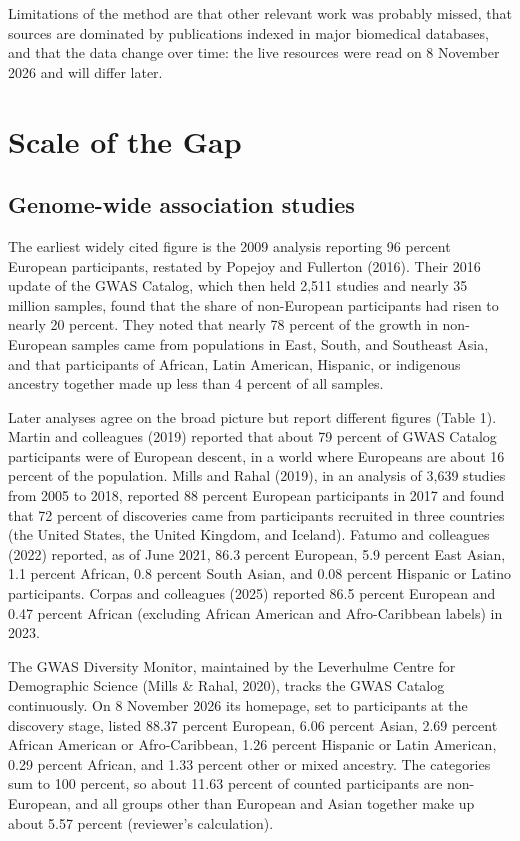 \documentclass[12pt]{article}
\begin{document}
Limitations of the method are that other relevant work was probably missed, that sources are dominated by publications indexed in major biomedical databases, and that the data change over time: the live resources were read on 8 November 2026 and will differ later.

\section*{Scale of the Gap}
\subsection*{Genome-wide association studies}
The earliest widely cited figure is the 2009 analysis reporting 96 percent European participants, restated by Popejoy and Fullerton (2016). Their 2016 update of the GWAS Catalog, which then held 2,511 studies and nearly 35 million samples, found that the share of non-European participants had risen to nearly 20 percent. They noted that nearly 78 percent of the growth in non-European samples came from populations in East, South, and Southeast Asia, and that participants of African, Latin American, Hispanic, or indigenous ancestry together made up less than 4 percent of all samples.

Later analyses agree on the broad picture but report different figures (Table 1). Martin and colleagues (2019) reported that about 79 percent of GWAS Catalog participants were of European descent, in a world where Europeans are about 16 percent of the population. Mills and Rahal (2019), in an analysis of 3,639 studies from 2005 to 2018, reported 88 percent European participants in 2017 and found that 72 percent of discoveries came from participants recruited in three countries (the United States, the United Kingdom, and Iceland). Fatumo and colleagues (2022) reported, as of June 2021, 86.3 percent European, 5.9 percent East Asian, 1.1 percent African, 0.8 percent South Asian, and 0.08 percent Hispanic or Latino participants. Corpas and colleagues (2025) reported 86.5 percent European and 0.47 percent African (excluding African American and Afro-Caribbean labels) in 2023.

The GWAS Diversity Monitor, maintained by the Leverhulme Centre for Demographic Science (Mills \& Rahal, 2020), tracks the GWAS Catalog continuously. On 8 November 2026 its homepage, set to participants at the discovery stage, listed 88.37 percent European, 6.06 percent Asian, 2.69 percent African American or Afro-Caribbean, 1.26 percent Hispanic or Latin American, 0.29 percent African, and 1.33 percent other or mixed ancestry. The categories sum to 100 percent, so about 11.63 percent of counted participants are non-European, and all groups other than European and Asian together make up about 5.57 percent (reviewer's calculation).
\end{document}
